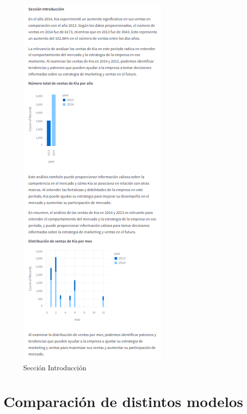 \begin{figure}[H] %
	\centering %
	\begin{minipage}{0.48\textwidth} %
		\centering
		\includegraphics[height=\textheight]{intro.png} %
		\caption{Sección Introducción}
		\label{fig:ejemplo_introduccion}
	\end{minipage}
\end{figure}


\section{Comparación de distintos modelos}

